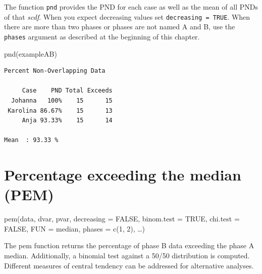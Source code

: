 \documentclass[
  letterpaper,
  DIV=11,
  numbers=noendperiod]{scrreprt}
\newenvironment{Shaded}{\begin{snugshade}}{\end{snugshade}}
\newcommand{\FunctionTok}[1]{\textcolor[rgb]{0.28,0.35,0.67}{#1}}
\newcommand{\NormalTok}[1]{\textcolor[rgb]{0.00,0.23,0.31}{#1}}
\begin{document}
The function \texttt{pnd} provides the PND for each case as well as the
mean of all PNDs of that \emph{scdf}. When you expect decreasing values
set \texttt{decreasing\ =\ TRUE}. When there are more than two phases or
phases are not named A and B, use the \texttt{phases} argument as
described at the beginning of this chapter.

\begin{Shaded}
\begin{Highlighting}[]
\FunctionTok{pnd}\NormalTok{(exampleAB)}
\end{Highlighting}
\end{Shaded}

\begin{verbatim}
Percent Non-Overlapping Data

     Case    PND Total Exceeds
  Johanna   100%    15      15
 Karolina 86.67%    15      13
     Anja 93.33%    15      14

Mean  : 93.33 %
\end{verbatim}

\hypertarget{percentage-exceeding-the-median-pem}{%
\section{Percentage exceeding the median
(PEM)}\label{percentage-exceeding-the-median-pem}}

\begin{tcolorbox}[enhanced jigsaw, toprule=.15mm, colframe=quarto-callout-tip-color-frame, left=2mm, colback=white, breakable, bottomrule=.15mm, arc=.35mm, rightrule=.15mm, leftrule=.75mm, opacityback=0]
\begin{minipage}[t]{5.5mm}
\textcolor{quarto-callout-tip-color}{\faLightbulb}
\end{minipage}%
\begin{minipage}[t]{\textwidth - 5.5mm}
pem(data, dvar, pvar, decreasing = FALSE, binom.test = TRUE, chi.test =
FALSE, FUN = median, phases = c(1, 2), \ldots)\end{minipage}%
\end{tcolorbox}

The pem function returns the percentage of phase B data exceeding the
phase A median. Additionally, a binomial test against a 50/50
distribution is computed. Different measures of central tendency can be
addressed for alternative analyses.
\end{document}
